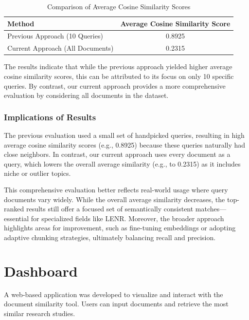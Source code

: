 \documentclass[12pt]{article}
\begin{document}
\begin{table}[h!]
    \centering
    \caption{Comparison of Average Cosine Similarity Scores}
    \label{tab:cosine-similarity-comparison}
    \begin{tabular}{|l|c|}
        \hline
        \textbf{Method} & \textbf{Average Cosine Similarity Score} \\ 
        \hline
        Previous Approach (10 Queries) & 0.8925 \\ 
        Current Approach (All Documents) & 0.2315 \\ 
        \hline
    \end{tabular}
\end{table}

The results indicate that while the previous approach yielded higher average cosine similarity scores, this can be attributed to its focus on only 10 specific queries. By contrast, our current approach provides a more comprehensive evaluation by considering all documents in the dataset.

\subsubsection{Implications of Results}

The previous evaluation used a small set of handpicked queries, resulting in high average cosine similarity scores (e.g., 0.8925) because these queries naturally had close neighbors. In contrast, our current approach uses every document as a query, which lowers the overall average similarity (e.g., to 0.2315) as it includes niche or outlier topics.

This comprehensive evaluation better reflects real-world usage where query documents vary widely. While the overall average similarity decreases, the top-ranked results still offer a focused set of semantically consistent matches—essential for specialized fields like LENR. Moreover, the broader approach highlights areas for improvement, such as fine-tuning embeddings or adopting adaptive chunking strategies, ultimately balancing recall and precision.

\section{Dashboard}
    A web-based application was developed to visualize and interact with the document similarity tool. 
    Users can input documents and retrieve the most similar research studies.
\end{document}
